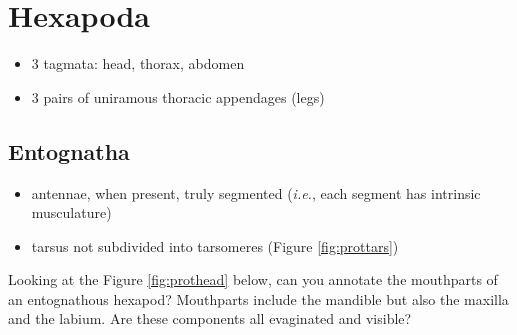\documentclass[letterpaper, 11pt]{article}
\begin{document}
\section*{Hexapoda}

\begin{itemize}
\item 3 tagmata: head, thorax, abdomen
\item 3 pairs of uniramous thoracic appendages (legs)
\end{itemize}

\subsection*{Entognatha}

\begin{itemize}
\item antennae, when present, truly segmented (\textit{i.e.}, each segment has intrinsic musculature)
\item tarsus not subdivided into tarsomeres (Figure \ref{fig:prottars})
\end{itemize}
Looking at the Figure \ref{fig:prothead} below, can you annotate the mouthparts of an entognathous hexapod? Mouthparts include the mandible but also the maxilla and the labium. Are these components all evaginated and visible?
\end{document}
